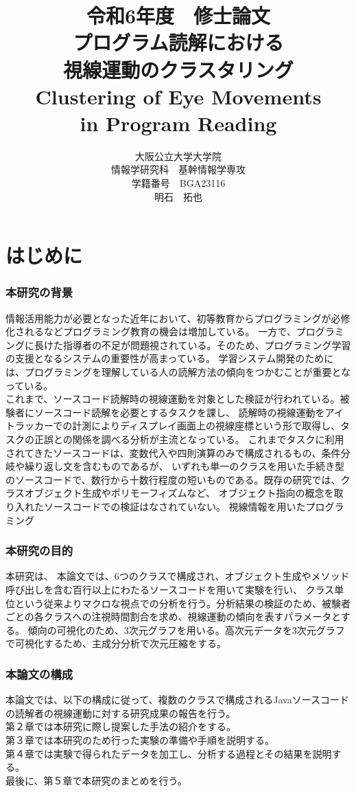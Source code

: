 \documentclass[paper=a4paper,fontsize=10pt]{jlreq}
\title{\huge 令和6年度　修士論文\\\vspace{100truept}プログラム読解における\\視線運動のクラスタリング\\
Clustering of Eye Movements\\ in Program Reading}
\author{\large 大阪公立大学大学院　\\情報学研究科　基幹情報学専攻\\学籍番号　BGA23116\\明石　拓也}
\begin{document}
\maketitle
\clearpage

\tableofcontents
\clearpage

\part{はじめに}
  \section{本研究の背景}
  情報活用能力が必要となった近年において、初等教育からプログラミングが必修化されるなどプログラミング教育の機会は増加している。
  一方で、プログラミングに長けた指導者の不足が問題視されている。そのため、プログラミング学習の支援となるシステムの重要性が高まっている。
  学習システム開発のためには、プログラミングを理解している人の読解方法の傾向をつかむことが重要となっている。\\
  これまで、ソースコード読解時の視線運動を対象とした検証が行われている。被験者にソースコード読解を必要とするタスクを課し、
  読解時の視線運動をアイトラッカーでの計測によりディスプレイ画面上の視線座標という形で取得し、タスクの正誤との関係を調べる分析が主流となっている。
  これまでタスクに利用されてきたソースコードは、変数代入や四則演算のみで構成されるもの、条件分岐や繰り返し文を含むものであるが、
  いずれも単一のクラスを用いた手続き型のソースコードで、数行から十数行程度の短いものである。既存の研究では、クラスオブジェクト生成やポリモーフィズムなど、
  オブジェクト指向の概念を取り入れたソースコードでの検証はなされていない。
  視線情報を用いたプログラミング
  

  \section{本研究の目的}
  本研究は、
  本論文では、6つのクラスで構成され、オブジェクト生成やメソッド呼び出しを含む百行以上にわたるソースコードを用いて実験を行い、
  クラス単位という従来よりマクロな視点での分析を行う。分析結果の検証のため、被験者ごとの各クラスへの注視時間割合を求め、視線運動の傾向を表すパラメータとする。
  傾向の可視化のため、3次元グラフを用いる。高次元データを3次元グラフで可視化するため、主成分分析で次元圧縮をする。

  \section{本論文の構成}
  本論文では、以下の構成に従って、複数のクラスで構成されるJavaソースコードの読解者の視線運動に対する研究成果の報告を行う。\\
  第２章では本研究に際し提案した手法の紹介をする。\\
  第３章では本研究のため行った実験の準備や手順を説明する。\\
  第４章では実験で得られたデータを加工し、分析する過程とその結果を説明する。\\
  最後に、第５章で本研究のまとめを行う。
\end{document}
